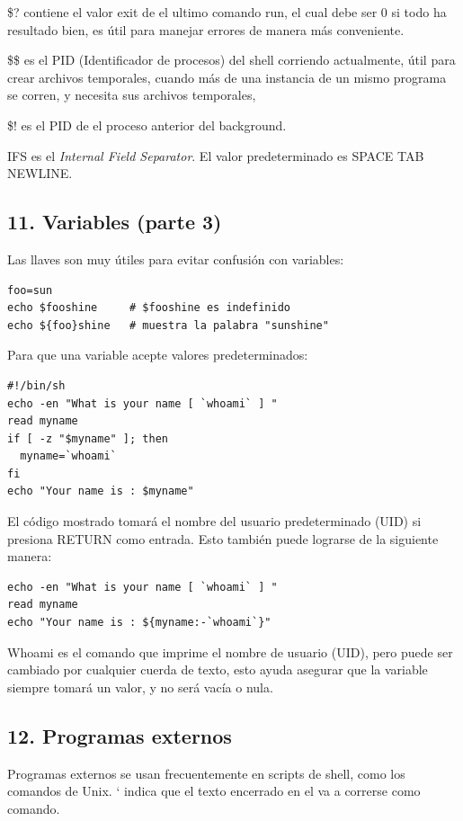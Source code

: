 \documentclass[a4paper]{article}
\begin{document}
\$? contiene el valor exit de el ultimo comando run, el cual debe ser 0 si todo ha resultado bien, es útil para manejar errores de manera más conveniente.

\$\$ es el PID (Identificador de procesos) del shell corriendo actualmente, útil para crear archivos temporales, cuando más de una instancia de un mismo programa se corren, y necesita sus archivos temporales,

\$! es el PID de el proceso anterior del background.

IFS es el \textit{Internal Field Separator}. El valor predeterminado es SPACE TAB NEWLINE.

\subsection*{11. Variables (parte 3)}

Las llaves son muy útiles para evitar confusión con variables:

\begin{verbatim}
foo=sun
echo $fooshine     # $fooshine es indefinido
echo ${foo}shine   # muestra la palabra "sunshine"
\end{verbatim}

Para que una variable acepte valores predeterminados:

\begin{verbatim}
#!/bin/sh
echo -en "What is your name [ `whoami` ] "
read myname
if [ -z "$myname" ]; then
  myname=`whoami`
fi
echo "Your name is : $myname"
\end{verbatim}

El código mostrado tomará el nombre del usuario predeterminado (UID) si presiona RETURN como entrada. Esto también puede lograrse de la siguiente manera:

\begin{verbatim}
echo -en "What is your name [ `whoami` ] "
read myname
echo "Your name is : ${myname:-`whoami`}"
\end{verbatim}

Whoami es el comando que imprime el nombre de usuario (UID), pero puede ser cambiado por cualquier cuerda de texto, esto ayuda  asegurar que la variable siempre tomará un valor, y no será vacía o nula.

\subsection*{12. Programas externos}

Programas externos se usan frecuentemente en scripts de shell, como los comandos de Unix. ` indica que el texto encerrado en el va a correrse como comando.
\end{document}
